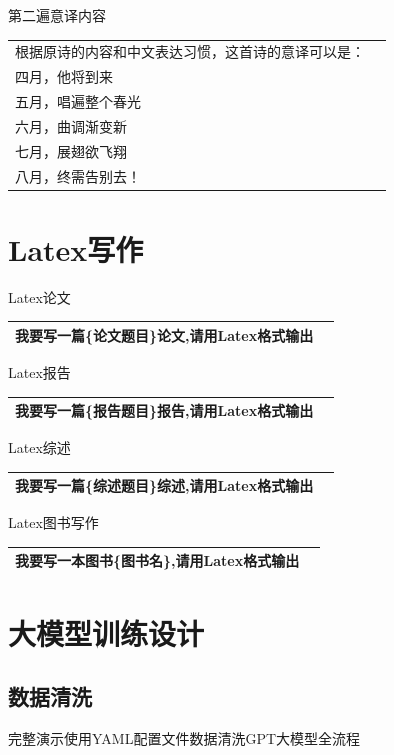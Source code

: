 \documentclass[12pt]{book}
\begin{document}
\bigskip
第二遍意译内容

\begin{tabular}{|p{15cm}|p{3cm}|}
	\hline
根据原诗的内容和中文表达习惯，这首诗的意译可以是：\\
四月，他将到来\\
五月，唱遍整个春光\\
六月，曲调渐变新\\
七月，展翅欲飞翔\\
八月，终需告别去！\\
	\hline
\end{tabular}

\section{Latex写作}
\bigskip
Latex论文

\begin{tabular}{|p{15cm}|p{3cm}|}
	\hline
	我要写一篇\{论文题目\}论文,请用Latex格式输出\\
	\hline
\end{tabular}


\bigskip
Latex报告

\begin{tabular}{|p{15cm}|p{3cm}|}
	\hline
	我要写一篇\{报告题目\}报告,请用Latex格式输出\\
	\hline
\end{tabular}


\bigskip
Latex综述

\begin{tabular}{|p{15cm}|p{3cm}|}
	\hline
	我要写一篇\{综述题目\}综述,请用Latex格式输出\\
	\hline
\end{tabular}


\bigskip
Latex图书写作

\begin{tabular}{|p{15cm}|p{3cm}|}
	\hline
	我要写一本图书\{图书名\},请用Latex格式输出\\
	\hline
\end{tabular}

\section{大模型训练设计}
\subsection{数据清洗}
完整演示使用YAML配置文件数据清洗GPT大模型全流程
\end{document}
